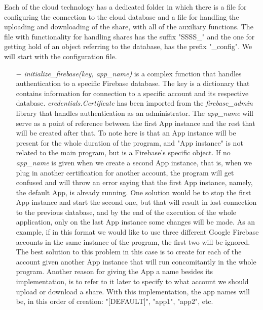 \documentclass[12pt, a4paper, oneside]{book}
\begin{document}
    Each of the cloud technology has a dedicated folder in which there is a file for configuring the connection to the cloud database and a file for handling the uploading and downloading of the share, with all of the auxiliary functions. The file with functionality for handling shares has the suffix "SSSS\_" and the one for getting hold of an object referring to the database, has the prefix "\_config". We will start with the configuration file.
    \vspace{-0.5cm}
    \begin{itemize}
        \item[$-$] {\it initialize\_firebase(key, app\_name)} is a complex function that handles authentication to a specific Firebase database. The key is a dictionary that contains information for connection to a specific account and its respective database. {\it credentials.Certificate} has been imported from the {\it firebase\_admin} library that handles authentication as an administrator. The {\it app\_name} will serve as a point of reference between the first App instance and the rest that will be created after that. To note here is that an App instance will be present for the whole duration of the program, and "App instance" is not related to the main program, but is a Firebase's specific object. If no {\it app\_name} is given when we create a second App instance, that is, when we plug in another certification for another account, the program will get confused and will throw an error saying that the first App instance, namely, the default App, is already running. One solution would be to stop the first App instance and start the second one, but that will result in lost connection to the previous database, and by the end of the execution of the whole application, only on the last App instance some changes will be made. As an example, if in this format we would like to use three different Google Firebase accounts in the same instance of the program, the first two will be ignored. The best solution to this problem in this case is to create for each of the account given another App instance that will run concomitantly in the whole program. Another reason for giving the App a name besides its implementation, is to refer to it later to specify to what account we should upload or download a share. With this implementation, the app names will be, in this order of creation: "[DEFAULT]", "app1", "app2", etc.
    \end{itemize}
\end{document}

